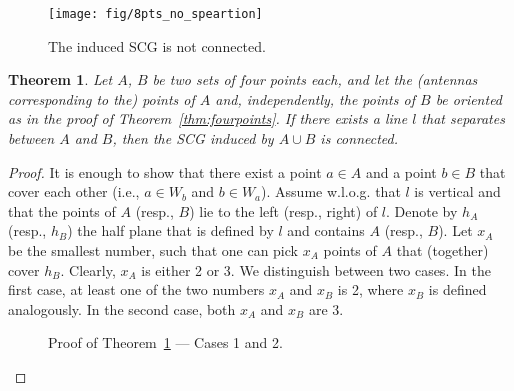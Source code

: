 \documentclass[11pt,letter]{article}
\newtheorem{theorem}{Theorem}[section]
\def\wedge#1{{W_{{#1}}}}
\def\halfplane#1{{h_{{#1}}}}
\begin{document}
\begin{figure}[htp]
   \centering
       \texttt{[image: fig/8pts\_no\_speartion]}
   \caption{The induced SCG is not connected.}
   \label{fig:8pts_no_speartion}
\end{figure}


\begin{theorem} \label{thm:twosets}
Let $A$, $B$ be two sets of four points each,
and
let the (antennas corresponding to the) points of $A$ and, independently, the points of $B$ be oriented as in the proof of Theorem~\ref{thm:fourpoints}.
If there exists a line $l$ that separates between $A$ and $B$, then
the SCG induced by $A\cup B$ is connected.
\end{theorem}


\begin{proof}
It is enough to show that there exist a point $a \in A$ and a point $b \in B$
that cover each other (i.e., $a \in \wedge{b}$ and $b \in \wedge{a}$).
Assume w.l.o.g. that $l$ is vertical and that the points of $A$ (resp., $B$)
lie to the left (resp., right) of $l$.
Denote by $\halfplane{A}$ (resp., $\halfplane{B}$) the half plane that is defined by $l$ and contains $A$ (resp., $B$).
Let $x_A$ be the smallest number, such that one can pick $x_A$ points of $A$
that (together) cover $\halfplane{B}$. Clearly, $x_A$ is either 2 or 3.
We distinguish between two cases. In the first case, at least one of the two numbers $x_A$ and $x_B$ is 2, where $x_B$ is defined analogously.
In the second case, both $x_A$ and $x_B$ are 3.

\begin{figure}[htb]
 \centering
 \hspace{0.5cm}
\caption{Proof of Theorem~\ref{thm:twosets} --- Cases 1 and 2.}
\end{figure}





\end{proof}
\end{document}
